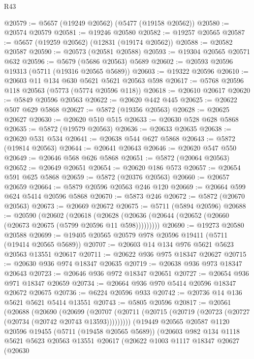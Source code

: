 \begin{lexlean}{R43}
\begin{coremodule}
@20579 := @5657 (@19249 @20562) (@5477 (@19158 @20562))
@20580 := @20574 @20579
@20581 := @19246 @20580
@20582 := @19257 @20565
@20587 := @5657 (@19259 @20562) (@12831 (@19174 @20562))
@20588 := @20582 @20587
@20590 := @20573 (@20581 @20588)
@20593 := @19304 @20565 @20571 @632
@20596 := @5679 (@5686 @20563) @5689
@20602 := @20593 @20596 @19313 (@5711 (@19316 @20565 @5689))
@20603 := @19322 @20596
@20610 := @20603 @11 @134 @630 @5621 @5621 @20563 @598
@20617 := @5768 @20596 @118 @20563 (@5773 (@5774 @20596 @118))
@20618 := @20610 @20617
@20620 := @5849 @20596 @20563
@20622 := @20620 @442 @445
@20625 := @20622 @507 @629 @5868
@20627 := @5872 (@19356 @20563)
@20628 := @20625 @20627
@20630 := @20620 @510 @515
@20633 := @20630 @528 @628 @5868
@20635 := @5872 (@19579 @20563)
@20636 := @20633 @20635
@20638 := @20620 @531 @534
@20641 := @20638 @544 @627 @5868
@20643 := @5872 (@19814 @20563)
@20644 := @20641 @20643
@20646 := @20620 @547 @550
@20649 := @20646 @568 @626 @5868
@20651 := @5872 (@20064 @20563)
@20652 := @20649 @20651
@20654 := @20620 @186 @573
@20657 := @20654 @591 @625 @5868
@20659 := @5872 (@20376 @20563)
@20660 := @20657 @20659
@20664 := @5879 @20596 @20563 @246 @120
@20669 := @20664 @599 @624 @5414 @20596 @5868
@20670 := @5873 @246
@20672 := @5872 (@20670 @20563)
@20673 := @20669 @20672
@20675 := @5711 (@5894 @20596)
@20688 := @20590
    (@20602
      (@20618 (@20628 (@20636 (@20644 (@20652 (@20660 (@20673 @20675 (@5799 @20596 @11 @598)))))))))
@20690 := @19273 @20580 @20588
@20699 := @19405 @20565 @20579 @978 @20596 @19411 (@5711 (@19414 @20565 @5689))
@20707 := @20603 @14 @134 @976 @5621 @5623 @20563 @13551 @20617
@20711 := @20622 @936 @975 @18347 @20627
@20715 := @20630 @936 @974 @18347 @20635
@20719 := @20638 @936 @973 @18347 @20643
@20723 := @20646 @936 @972 @18347 @20651
@20727 := @20654 @936 @971 @18347 @20659
@20734 := @20664 @936 @970 @5414 @20596 @18347 @20672 @20675
@20736 := @6224 @20596 @933
@20742 := @20736 @14 @136 @5621 @5621 @5414 @13551
@20743 := @5805 @20596
@20817 := @20561
    (@20688
      (@20690
        (@20699
          (@20707 (@20711 (@20715 (@20719 (@20723 (@20727 (@20734 (@20742 @20743 @13593)))))))))
        (@19449
          @20565
          @20587
          @1120
          @20596
          @19455
          (@5711 (@19458 @20565 @5689))
          (@20603
            @982
            @134
            @1118
            @5621
            @5623
            @20563
            @13551
            @20617
            (@20622
              @1003
              @1117
              @18347
              @20627
              (@20630

\end{coremodule}
\end{lexlean}

